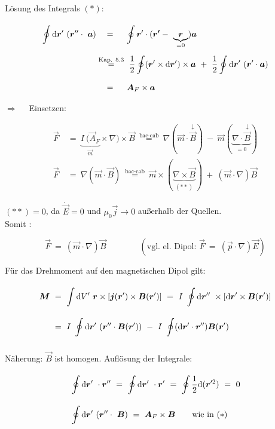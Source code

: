 Lösung des Integrals $(*)$:

\begin{align*}
\Oint{}{}{\vec{r}'} (\vec{r}''\cdot \ \vec{a}) & \quad = \quad \ \oint{}{}{\vec{r}'} \cdot (\vec{r'}- \ \underbrace{\vec{r}}_{=0}) \vec{a}\\
& \overset{\text{Kap. 5.3}}{=} \ \frac{1}{2}\oint(\vec{r}'\times\d\vec{r}')\times\vec{a} \ + \ \frac{1}{2}\Oint{}{}{\vec{r}'}(\vec{r}'\cdot\vec{a})\\
& \quad = \quad \ \vec{A}_F \times\vec{a}
\end{align*}

$\Rightarrow\quad$ Einsetzen:

\begin{align*}
\vec{F}  \ &= \ \underbrace{I \ (\vec{A}_F}_{\vec{m}} \times \nabla)\times \vec{B} \ \overset{\text{bac-cab}}{=} \ \nabla(\vec{m}\cdot\overset{\downarrow}{\vec{B}}) \ - \ \vec{m}(\underbrace{\nabla\cdot\overset{\downarrow}{\vec{B}}}_{=0})\\
\vec{F}  \ &= \ \nabla(\vec{m}\cdot\vec{B}) \ \overset{\text{bac-cab}}{=} \ \vec{m} \times (\underbrace{\nabla\times\vec{B}}_{(**)}) \ + \ (\vec{m}\cdot\nabla)\vec{B}
\end{align*}

$(**)=0$, da $\dot{\vec{E}}=0$ und $\mu_0\vec{j}\rightarrow 0$ außerhalb der Quellen.\\
Somit :

\begin{equation*}
\vec{F}  \ = \  (\vec{m}\cdot\nabla) \vec{B} \qquad\qquad (\text{vgl. el. Dipol: } \vec{F}  \ = \ (\vec{p}\cdot\nabla)\vec{E})
\end{equation*}

Für das Drehmoment auf den magnetischen Dipol gilt:

\begin{align*}
\vec{M}  \ &= \ \Int{}{}{V'} \vec{r}\times\left[\vec{j}(\vec{r}') \times \vec{B}(\vec{r}')\right] \ = \  I  \ \Oint{}{}{\vec{r}''} \times \left[\d\vec{r}' \times\vec{B}(\vec{r}')\right]\\
 &= \ I \ \Oint{}{}{\vec{r}'}(\vec{r}''\cdot\vec{B}(\vec{r}')) \ - \ I \ \oint(\d\vec{r}'\cdot\vec{r}'')\vec{B}(\vec{r}')
\end{align*}

Näherung: $\vec{B}$ ist homogen. Auflösung der Integrale:

\begin{align*}
&\Oint{}{}{\vec{r}'} \cdot \vec{r}'' \ = \ \Oint{}{}{\vec{r}'}\cdot\vec{r}'  \ = \ \oint\frac{1}{2}\d(\vec{r}'^2)  \ = \ 0\\
&\Oint{}{}{\vec{r}'} (\vec{r}''\cdot\ \vec{B})  \ = \ \vec{A}_F \times\vec{B} \qquad \text{wie in } (*)
\end{align*}


